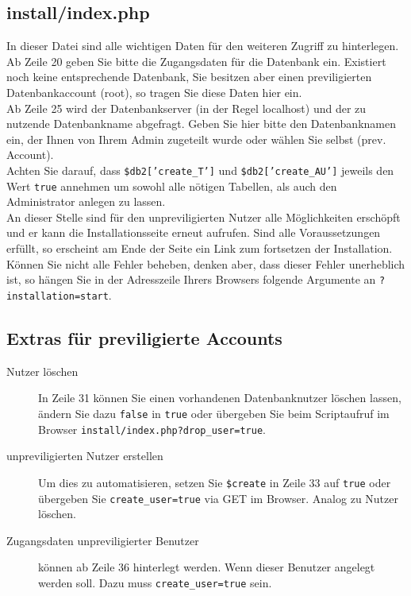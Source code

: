 \documentclass[a4paper,10pt,twoside]{article}
\begin{document}
 \subsection{install/index.php}
   In dieser Datei sind alle wichtigen Daten für den weiteren Zugriff zu
   hinterlegen. Ab Zeile 20 geben Sie bitte die Zugangsdaten für die Datenbank
   ein. Existiert noch keine entsprechende Datenbank, Sie besitzen aber einen
   previligierten Datenbankaccount (root), so tragen Sie diese Daten hier ein.\\
   Ab Zeile 25 wird der Datenbankserver (in der Regel \textsf{localhost}) und
   der zu nutzende Datenbankname abgefragt. Geben Sie hier bitte den
   Datenbanknamen ein, der Ihnen von Ihrem Admin zugeteilt wurde oder wählen Sie
   selbst (prev. Account).\\
   Achten Sie darauf, dass \texttt{\$db2['create\_T']} und
   \texttt{\$db2['create\_AU']} jeweils den Wert \texttt{true} annehmen um
   sowohl alle nötigen Tabellen, als auch den Administrator anlegen zu lassen.\\
   An dieser Stelle sind für den unpreviligierten Nutzer alle Möglichkeiten
   erschöpft und er kann die Installationsseite erneut aufrufen. Sind alle
   Voraussetzungen erfüllt, so erscheint am Ende der Seite ein Link zum
   fortsetzen der Installation. Können Sie nicht alle Fehler beheben, denken
   aber, dass dieser Fehler unerheblich ist, so hängen Sie in der Adresszeile
   Ihrers Browsers folgende Argumente an \texttt{?installation=start}.
   
 \subsection{Extras für previligierte Accounts}
  \begin{description}
 	\item[Nutzer löschen] In Zeile 31 können Sie einen vorhandenen Datenbanknutzer
	löschen lassen, ändern Sie dazu \texttt{false} in \texttt{true} oder übergeben
	Sie beim Scriptaufruf im Browser \texttt{install/index.php?drop\_user=true}.
	\item[unpreviligierten Nutzer erstellen] Um dies zu automatisieren, setzen Sie
	\texttt{\$create} in Zeile 33 auf \texttt{true} oder übergeben Sie 
	\texttt{create\_user=true}
	via GET im Browser. Analog zu Nutzer löschen.
	\item[Zugangsdaten unpreviligierter Benutzer] können ab Zeile 36 hinterlegt
	werden. Wenn dieser Benutzer angelegt werden soll. Dazu muss
	\texttt{create\_user=true} sein.
	
  \end{description}
%
\end{document}
